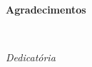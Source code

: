 
\pagestyle{plain}

\vspace*{2cm}
\begin{center}
\Large \bf Agradecimentos
\end{center}
\vspace*{1cm} \setlength{\baselineskip}{0.6cm}



\cleardoublepage~\vfill

\begin{flushright}\textit{Dedicatória}\end{flushright}


